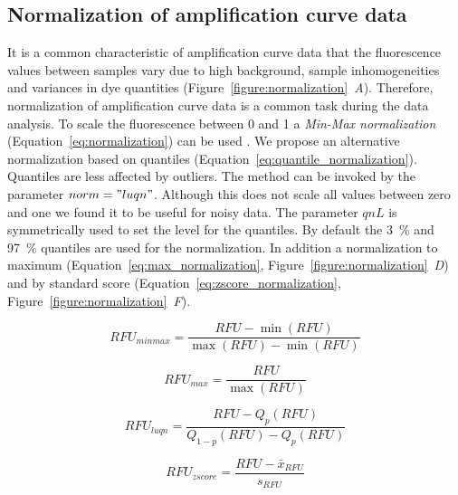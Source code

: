 \documentclass[twocolumn]{bmcart}%
\begin{document}
\subsection*{Normalization of amplification curve data}

It is a common characteristic of amplification curve data that the fluorescence 
values between samples vary due to high background, sample inhomogeneities and 
variances in dye quantities (Figure~\ref{figure:normalization}~\emph{A}). 
Therefore, normalization of amplification curve data is a common task during the 
data analysis. To scale the fluorescence between 0 and 1 a \emph{Min-Max 
normalization} (Equation~\ref{eq:normalization}) can be used 
\cite{roediger_RJ_2013}. We propose an alternative normalization based on 
quantiles (Equation~\ref{eq:quantile_normalization}). Quantiles are less 
affected by outliers. The method can be invoked by the parameter $norm = 
"luqn"$. Although this does not scale all values between zero and one we found 
it to be useful for noisy data. The parameter $qnL$ is symmetrically used to set 
the level for the quantiles. By default the 3~\% and 97~\% quantiles are used 
for the normalization. In addition a normalization to maximum 
(Equation~\ref{eq:max_normalization}, 
Figure~\ref{figure:normalization}~\emph{D}) and by standard score 
(Equation~\ref{eq:zscore_normalization}, 
Figure~\ref{figure:normalization}~\emph{F}).

\begin{equation} \label{eq:normalization}
RFU_{minmax} = \frac{RFU - \min(RFU)}{\max(RFU) - \min(RFU)}
\end{equation}

\begin{equation} \label{eq:max_normalization}
RFU_{max} = \frac{RFU}{\max(RFU)}
\end{equation}

\begin{equation} \label{eq:quantile_normalization}
RFU_{luqn} = \frac{RFU - Q_{p}(RFU)}{Q_{1 - p}(RFU) - 
Q_{p}(RFU)}
\end{equation}

\begin{equation} \label{eq:zscore_normalization}
RFU_{zscore} = \frac{RFU - \bar{x}_{RFU}}{s_{RFU}}
\end{equation}
\end{document}
